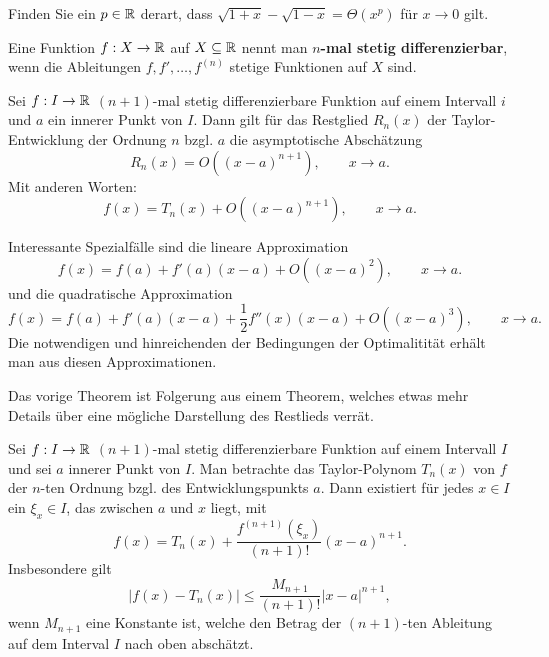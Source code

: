 \begin{aufg}
	Finden Sie ein $p \in \mathbb{R}$ derart, dass $\sqrt{1+x} - \sqrt{1-x} = \Theta (x^p)$ für $x \to 0$ gilt. 
\end{aufg} 


\begin{defn}
	Eine Funktion $f: X \to \mathbb{R}$ auf $X \subseteq \mathbb{R}$ nennt man \textbf{$n$-mal stetig differenzierbar}, wenn die Ableitungen $f, f',\ldots, f^{(n)}$ stetige Funktionen auf $X$ sind. 
\end{defn} 

\begin{thm}  
	Sei $f : I \to \mathbb{R}$ $(n+1)$-mal stetig differenzierbare Funktion auf einem Intervall $i$  und $a$ ein innerer Punkt von $I$. Dann gilt für das Restglied $R_n(x)$ der Taylor-Entwicklung  der Ordnung $n$ bzgl. $a$ die asymptotische Abschätzung
	\[
		R_n(x) = O( (x-a)^{n+1}), \qquad x \to a. 
	\]
	Mit anderen Worten: 
	\[
		f(x) = T_n(x) + O((x-a)^{n+1}), \qquad x \to a. 
	\]
\end{thm} 

\begin{bem}
	Interessante Spezialfälle sind die lineare Approximation
	\[
		f(x) = f(a)+ f'(a) (x-a) + O((x-a)^2), \qquad x \to a. 
	\]
	und die quadratische Approximation
	\[
		f(x) = f(a) + f'(a)(x-a) + \frac{1}{2} f''(x) (x-a) + O((x-a)^3), \qquad x \to a. 
	\]
	Die notwendigen und hinreichenden der Bedingungen der Optimalitität erhält man aus diesen Approximationen. 
\end{bem}


\begin{bem} 
	Das vorige Theorem ist Folgerung aus einem Theorem, welches etwas mehr Details über eine mögliche Darstellung des Restlieds verrät. 
\end{bem} 

\begin{thm} 
	Sei $f: I \to \mathbb{R}$ $(n+1)$-mal stetig differenzierbare Funktion auf einem Intervall $I$ und sei $a$ innerer Punkt von $I$. Man betrachte das Taylor-Polynom $T_n(x)$ von $f$ der $n$-ten Ordnung bzgl. des Entwicklungspunkts $a$. Dann existiert für jedes $x \in I$ ein $\xi_x \in I$, das zwischen $a$ und $x$ liegt, mit 
	\[
		f(x)  = T_n(x) + \frac{f^{(n+1)}(\xi_x)}{(n+1)!} (x-a)^{n+1}. 
	\]
	Insbesondere gilt 
	\[
		|f(x) - T_n(x)| \le \frac{M_{n+1}}{(n+1)!} |x-a|^{n+1},
	\]
	wenn $M_{n+1}$ eine Konstante ist, welche den Betrag der $(n+1)$-ten Ableitung auf dem Interval $I$ nach oben abschätzt. 
\end{thm} 

